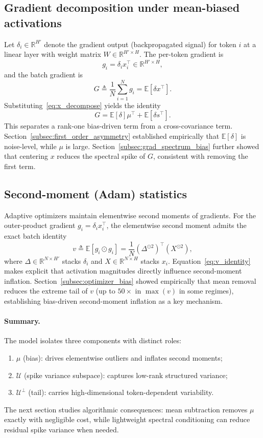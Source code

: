 \subsection{Gradient decomposition under mean-biased activations}
\label{subsec:model_grad}

Let $\delta_i \in \mathbb{R}^{H'}$ denote the gradient output (backpropagated
signal) for token $i$ at a linear layer with weight matrix
$W\in\mathbb{R}^{H'\times H}$.
The per-token gradient is
\[
g_i = \delta_i x_i^\top \in \mathbb{R}^{H'\times H},
\]
and the batch gradient is
\[
G \triangleq \frac{1}{N}\sum_{i=1}^N g_i
= \mathbb{E}[\delta x^\top].
\]
Substituting~\eqref{eq:x_decompose} yields the identity
\begin{equation}
\label{eq:G_decompose}
G
=
\mathbb{E}[\delta]\mu^\top
+
\mathbb{E}[\delta s^\top].
\end{equation}
This separates a rank-one bias-driven term from a cross-covariance term.
Section~\ref{subsec:first_order_asymmetry} established empirically that
$\mathbb{E}[\delta]$ is noise-level, while $\mu$ is large.
Section~\ref{subsec:grad_spectrum_bias} further showed that centering $x$
reduces the spectral spike of $G$, consistent with removing the first term.

\subsection{Second-moment (Adam) statistics}
\label{subsec:model_adam}

Adaptive optimizers maintain elementwise second moments of gradients.
For the outer-product gradient $g_i=\delta_i x_i^\top$, the elementwise second
moment admits the exact batch identity
\begin{equation}
\label{eq:v_identity}
v \triangleq \mathbb{E}[g_i \odot g_i]
=
\frac{1}{N}(\Delta^{\odot 2})^\top (X^{\odot 2}),
\end{equation}
where $\Delta\in\mathbb{R}^{N\times H'}$ stacks $\delta_i$ and
$X\in\mathbb{R}^{N\times H}$ stacks $x_i$.
Equation~\eqref{eq:v_identity} makes explicit that activation magnitudes
directly influence second-moment inflation.
Section~\ref{subsec:optimizer_bias} showed empirically that mean removal reduces
the extreme tail of $v$ (up to $50\times$ in $\max(v)$ in some regimes),
establishing bias-driven second-moment inflation as a key mechanism.

\paragraph{Summary.}
The model isolates three components with distinct roles:
\begin{enumerate}
\item $\mu$ (bias): drives elementwise outliers and inflates second moments;
\item $\mathcal{U}$ (spike variance subspace): captures low-rank structured variance;
\item $\mathcal{U}^\perp$ (tail): carries high-dimensional token-dependent variability.
\end{enumerate}
The next section studies algorithmic consequences: mean subtraction removes
$\mu$ exactly with negligible cost, while lightweight spectral conditioning can
reduce residual spike variance when needed.